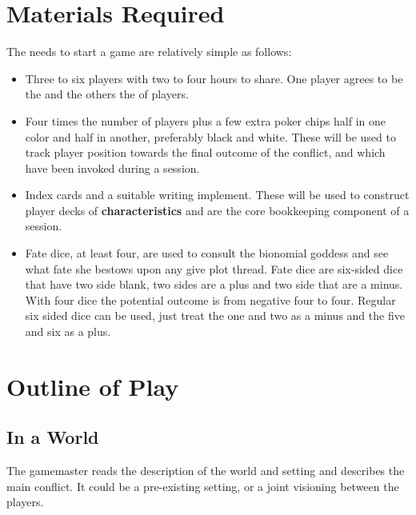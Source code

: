\section{Materials Required}

The needs to start a game are relatively simple as follows:

\begin{itemize}
\item Three to six players with two to four hours to share. One player agrees to be the  and the others the  of players.
\item Four times the number of players plus a few extra poker chips half in one color and half in another, preferably black and white. These will be used to track player position towards the final outcome of the conflict, and which 
have been invoked during a session.
\item Index cards and a suitable writing implement. These will be used to construct player decks of \textbf{characteristics} and are the core bookkeeping component of a session.
\item Fate dice, at least four, are used to consult the bionomial goddess and see what fate she bestows upon any give plot thread. Fate dice are six-sided dice that have two side blank, two sides are a plus and two side that are a minus. With four dice the potential outcome is from negative four to four. Regular six sided dice can be used, just treat the one and two as a minus and the five and six as a plus. 

\end{itemize}

\section{Outline of Play}

\subsection{In a World}

The gamemaster reads the description of the world and setting and describes the main conflict. It could be a pre-existing setting, or a joint visioning between the players. 

